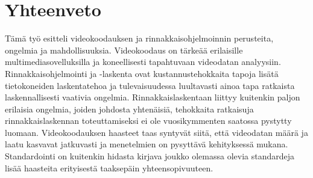 \section{Yhteenveto}

Tämä työ esitteli videokoodauksen ja rinnakkaisohjelmoinnin perusteita,
ongelmia ja mahdollisuuksia. Videokoodaus on tärkeää erilaisille
multimediasovelluksilla ja koneellisesti tapahtuvaan videodatan analyysiin.
Rinnakkaisohjelmointi ja -laskenta ovat kustannustehokkaita tapoja lisätä
tietokoneiden laskentatehoa ja tulevaisuudessa luultavasti ainoa tapa ratkaista
laskennallisesti vaativia ongelmia. Rinnakkaislaskentaan liittyy kuitenkin
paljon erilaisia ongelmia, joiden johdosta yhtenäisiä, tehokkaita ratkaisuja
rinnakkaislaskennan toteuttamiseksi ei ole vuosikymmenten saatossa pystytty
luomaan. Videokoodauksen haasteet taas syntyvät siitä, että videodatan määrä
ja laatu kasvavat jatkuvasti ja menetelmien on pysyttävä kehityksessä mukana.
Standardointi on kuitenkin hidasta kirjava joukko olemassa olevia standardeja
lisää haasteita erityisestä taaksepäin yhteensopivuuteen.

